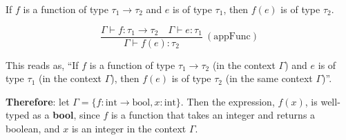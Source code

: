 \vspace{-1em}
\begin{Example}

    \label{ex:function_application}
    
    If $f$ is a function of type $\tau_1 \rightarrow \tau_2$ and $e$ is of type $\tau_1$, then $f(e)$ is of type $\tau_2$.
    \LARGE

    \[
    \frac{\Gamma \vdash f : \tau_1 \rightarrow \tau_2 \quad \Gamma \vdash e : \tau_1}{\Gamma \vdash f(e) : \tau_2} \ (\text{appFunc})
    \]

    \vspace{.5em}
    \normalsize
    \noindent
    This reads as, ``If $f$ is a function of type $\tau_1 \rightarrow \tau_2$ (in the context $\Gamma$) and $e$ is of type $\tau_1$ 
    (in the context $\Gamma$), then $f(e)$ is of type $\tau_2$ (in the same context $\Gamma$)''.

    \vspace{1em}
    \noindent
    \textbf{Therefore}: let $\Gamma = \{f : \text{int} \rightarrow \text{bool}, x : \text{int}\}$. Then the expression, $f(x)$, 
    is well-typed as a \textbf{bool}, since $f$ is a function that takes an integer and returns a boolean, and $x$ is an integer 
    in the context $\Gamma$.
\end{Example}
